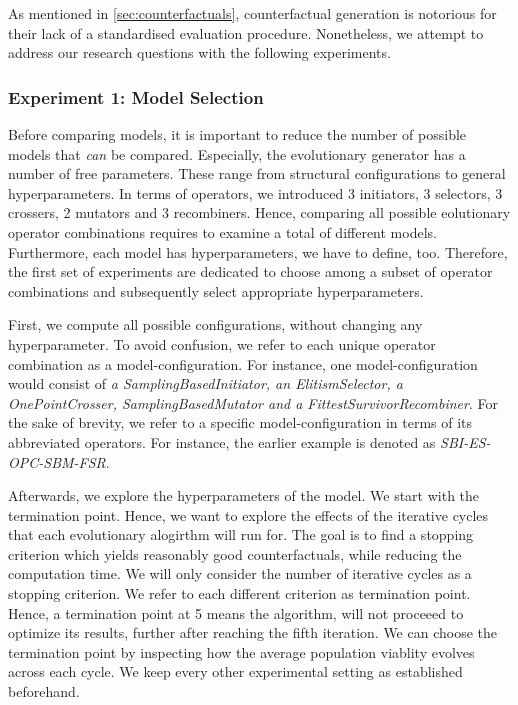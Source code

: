 \documentclass[./../../paper.tex]{subfiles}
\begin{document}
As mentioned in \autoref{sec:counterfactuals}, counterfactual generation is notorious for their lack of a standardised evaluation procedure. Nonetheless, we attempt to address our research questions with the following experiments.

\subsubsection{Experiment 1: Model Selection}
Before comparing models, it is important to reduce the number of possible models that \emph{can} be compared. Especially, the evolutionary generator has a number of free parameters. These range from structural configurations to general hyperparameters. In terms of operators, we introduced 3 initiators, 3 selectors, 3 crossers, 2 mutators and 3 recombiners. Hence, comparing all possible eolutionary operator combinations requires to examine a total of \NumEvoCombinations different models. Furthermore, each model has hyperparameters, we have to define, too. Therefore, the first set of experiments are dedicated to choose among a subset of operator combinations and subsequently select appropriate hyperparameters. 

First, we compute all possible configurations, without changing any hyperparameter. To avoid confusion, we refer to each unique operator combination as a model-configuration. For instance, one model-configuration would consist of \emph{a SamplingBasedInitiator, an ElitismSelector, a OnePointCrosser, SamplingBasedMutator and a FittestSurvivorRecombiner}. For the sake of brevity, we refer to a specific model-configuration in terms of its abbreviated operators. For instance, the earlier example is denoted as \emph{SBI-ES-OPC-SBM-FSR}.

Afterwards, we explore the hyperparameters of the model. We start with the termination point. Hence, we want to explore the effects of the iterative cycles that each evolutionary alogirthm will run for. The goal is to find a stopping criterion which yields reasonably good counterfactuals, while reducing the computation time. We will only consider the number of iterative cycles as a stopping criterion. We refer to each different criterion as termination point. Hence, a termination point at 5 means the algorithm, will not proceeed to optimize its results, further after reaching the fifth iteration. We can choose the termination point by inspecting how the average population viablity evolves across each cycle. We keep every other experimental setting as established beforehand.
\end{document}
